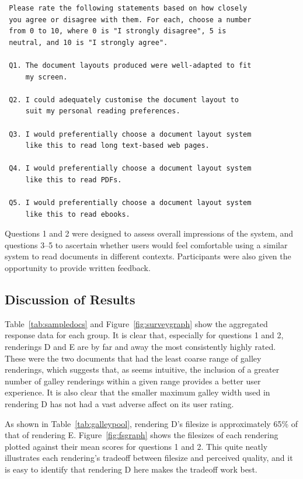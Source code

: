 \begin{verbatim}
 Please rate the following statements based on how closely
 you agree or disagree with them. For each, choose a number
 from 0 to 10, where 0 is "I strongly disagree", 5 is
 neutral, and 10 is "I strongly agree".

 Q1. The document layouts produced were well-adapted to fit
     my screen.

 Q2. I could adequately customise the document layout to
     suit my personal reading preferences.

 Q3. I would preferentially choose a document layout system
     like this to read long text-based web pages.

 Q4. I would preferentially choose a document layout system
     like this to read PDFs.

 Q5. I would preferentially choose a document layout system
     like this to read ebooks.
\end{verbatim}

Questions 1 and 2 were designed to assess overall impressions of the system, and questions 3--5 to ascertain whether users would feel comfortable using a similar system to read documents in different contexts.
Participants were also given the opportunity to provide written feedback.

\subsection{Discussion of Results}
Table~\ref{tab:sampledocs} and Figure~\ref{fig:surveygraph} show the aggregated response data for each group. It is clear that, especially for questions 1 and 2, renderings D and E are by far and away the most consistently highly rated. These were the two documents that had the least coarse range of galley renderings, which suggests that, as seems intuitive, the inclusion of a greater number of galley renderings within a given range provides a better user experience. It is also clear that the smaller maximum galley width used in rendering D has not had a vast adverse affect on its user rating.

As shown in Table~\ref{tab:galleypool}, rendering D's filesize is approximately 65\% of that of rendering E. Figure~\ref{fig:fsgraph} shows the filesizes of each rendering plotted against their mean scores for questions 1 and 2. This quite neatly illustrates each rendering's tradeoff between filesize and perceived quality, and it is easy to identify that rendering D here makes the tradeoff work best.

